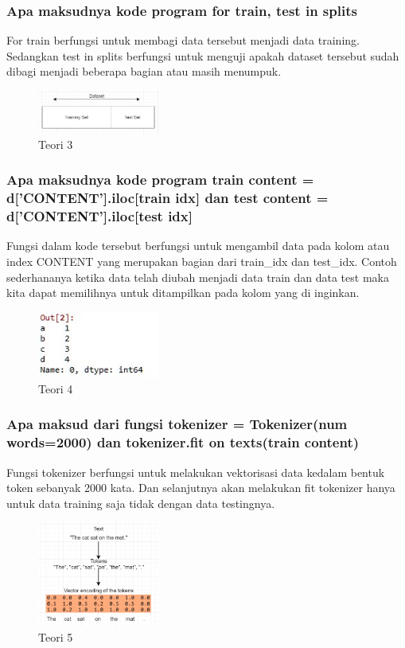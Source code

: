 \subsubsection{Apa maksudnya kode program for train, test in splits}
\hfill\break
For train berfungsi untuk membagi data tersebut menjadi data training. Sedangkan test in splits berfungsi untuk menguji apakah dataset tersebut sudah dibagi menjadi beberapa bagian atau masih menumpuk.
\begin{figure}[H]
\centering
	\includegraphics[width=4cm]{figures/1174057/chapter7/3.jpg}
\caption{Teori 3}
\end{figure}

\subsubsection{Apa maksudnya kode program train content = d[’CONTENT’].iloc[train idx] dan test content = d[’CONTENT’].iloc[test idx]}
\hfill\break
Fungsi dalam kode tersebut berfungsi untuk mengambil data pada kolom atau index CONTENT yang merupakan bagian dari train\_idx dan test\_idx. Contoh sederhananya ketika data telah diubah menjadi data train dan data test maka kita dapat memilihnya untuk ditampilkan pada kolom yang di inginkan. 

\begin{figure}[H]
\centering
	\includegraphics[width=4cm]{figures/1174057/chapter7/4.jpg}
\caption{Teori 4}
\end{figure}

\subsubsection{Apa maksud dari fungsi tokenizer = Tokenizer(num words=2000) dan tokenizer.fit on texts(train content)}
\hfill\break
Fungsi tokenizer berfungsi untuk melakukan vektorisasi data kedalam bentuk token sebanyak 2000 kata. Dan selanjutnya akan melakukan fit tokenizer hanya untuk data training saja tidak dengan data testingnya.
\begin{figure}[H]
\centering
	\includegraphics[width=4cm]{figures/1174057/chapter7/5.jpg}
\caption{Teori 5}
\end{figure}

